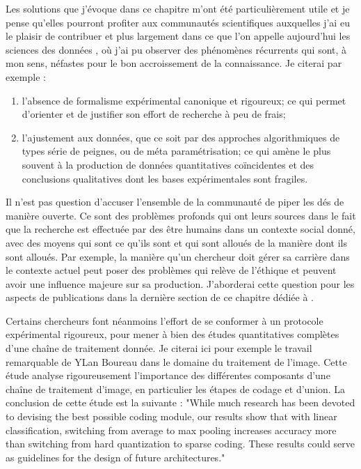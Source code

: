 Les solutions que j'évoque dans ce chapitre m'ont été particulièrement utile et je pense qu'elles pourront profiter aux communautés scientifiques auxquelles j'ai eu le plaisir de contribuer et plus largement dans ce que l'on appelle aujourd'hui \og les sciences des données \fg, où j'ai pu observer des phénomènes récurrents qui sont, à mon sens, néfastes pour le bon accroissement de la connaissance. Je citerai par exemple :
\begin{enumerate}
  \item l'absence de formalisme expérimental canonique et rigoureux; ce qui permet d'orienter et de justifier son effort de recherche à peu de frais;
  \item l'ajustement aux données, que ce soit par des approches algorithmiques de types série de peignes, ou de méta paramétrisation; ce qui amène le plus souvent à la production de données quantitatives coïncidentes et des conclusions qualitatives dont les bases expérimentales sont fragiles.
\end{enumerate}

Il n'est pas question d'accuser l'ensemble de la communauté de \og piper les dés \fg de manière ouverte. Ce sont des problèmes profonds qui ont leurs sources dans le fait que la recherche est effectuée par des être humains dans un contexte social donné, avec des moyens qui sont ce qu'ils sont et qui sont alloués de la manière dont ils sont alloués. Par exemple, la manière qu'un chercheur doit gérer sa carrière dans le contexte actuel peut poser des problèmes qui relève de l'éthique et peuvent avoir une influence majeure sur sa production. J'aborderai cette question pour les aspects de publications dans la dernière section de ce chapitre dédiée à .

Certains chercheurs font néanmoins l'effort de se conformer à un protocole expérimental rigoureux, pour mener à bien des études quantitatives complètes d'une chaîne de traitement donnée. Je citerai ici pour exemple le travail remarquable de YLan Boureau dans le domaine du traitement de l'image\cite{boureau2010learning}. Cette étude analyse rigoureusement l'importance des différentes composants d'une chaîne de traitement d'image, en particulier les étapes de codage et d'union. La conclusion de cette étude est la suivante :  "While much research has been devoted to devising
the best possible coding module, our results show that with
linear classification, switching from average to max pooling
increases accuracy more than switching from hard quantization to sparse coding. These results could serve as guidelines for the design of future architectures."

